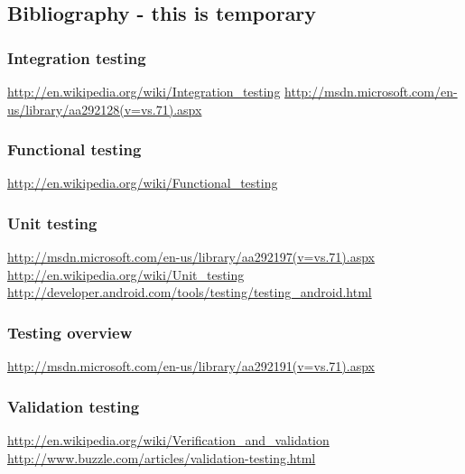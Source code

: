\subsection{Bibliography - this is temporary}
	
	\subsubsection{Integration testing}
	\url{http://en.wikipedia.org/wiki/Integration_testing}
	\url{http://msdn.microsoft.com/en-us/library/aa292128(v=vs.71).aspx}

	\subsubsection{Functional testing}
	\url{http://en.wikipedia.org/wiki/Functional_testing}

	\subsubsection{Unit testing}
	\url{http://msdn.microsoft.com/en-us/library/aa292197(v=vs.71).aspx}
	\url{http://en.wikipedia.org/wiki/Unit_testing}
	\url{http://developer.android.com/tools/testing/testing_android.html}

	\subsubsection{Testing overview}
	\url{http://msdn.microsoft.com/en-us/library/aa292191(v=vs.71).aspx}

	\subsubsection{Validation testing}
	\url{http://en.wikipedia.org/wiki/Verification_and_validation}
	\url{http://www.buzzle.com/articles/validation-testing.html}